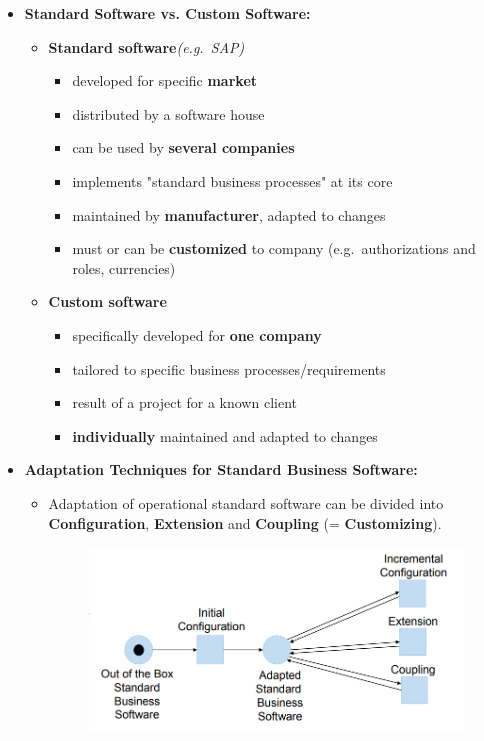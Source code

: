 \documentclass[ieeetran]{article}
\begin{document}
\begin{itemize}
  \item \textbf{Standard Software vs. Custom Software:}
	  \begin{itemize}
	    \item \textbf{Standard software}\textit{(e.g.\ SAP)}
		    \begin{itemize}
		      \item developed for specific \textbf{market}
		\item distributed by a software house
			\item can be used by \textbf{several companies}
			\item implements "standard business processes" at its core
			\item maintained by \textbf{manufacturer}, adapted to changes
			\item must or can be \textbf{customized} to company (e.g.\ authorizations and roles, currencies) 
		    \end{itemize}
	\item \textbf{Custom software}
		\begin{itemize}
		  \item specifically developed for \textbf{one company}
	\item tailored to specific business processes/requirements
		\item result of a project for a known client
			\item \textbf{individually} maintained and adapted to changes
		\end{itemize}
	  \end{itemize}
\pagebreak
\item \textbf{Adaptation Techniques for Standard Business Software:}
	\begin{itemize}
		\item Adaptation of operational standard software can be divided into \textbf{Configuration}, \textbf{Extension} and \textbf{Coupling} (= \textbf{Customizing}).
               \begin{figure}[h!]
                 \centering
                 \includegraphics[width=0.5\linewidth]{adaptationsbs.png}
                 \label{fig:adaptationsbs_png}
               \end{figure} 


\end{itemize}
\end{itemize}
\end{document}
